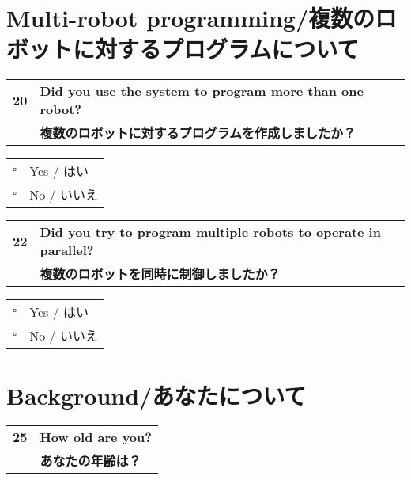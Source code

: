\begin{Form}
\section*{Multi-robot programming/複数のロボットに対するプログラムについて}
\vspace{.05in}
\begin{tabular}{rl}
\textbf{20} & \textbf{Did you use the system to program more than one robot?}\\
{} & \textbf{複数のロボットに対するプログラムを作成しましたか？}\\
\end{tabular}

\begin{tabular}{rl}
\quad $\square$ & Yes / はい \\
\quad $\square$ & No /  いいえ \\
\end{tabular}
\vspace{.1in}


\vspace{.05in}
\begin{tabular}{rl}
\textbf{22} & \textbf{Did you try to program multiple robots to operate in parallel?}\\
{} & \textbf{複数のロボットを同時に制御しましたか？}\\
\end{tabular}

\begin{tabular}{rl}
\quad $\square$ & Yes / はい \\
\quad $\square$ & No /  いいえ \\
\end{tabular}
\vspace{.1in}



\section*{Background/あなたについて}
\vspace{.05in}
\begin{tabular}{rl}
\textbf{25} & \textbf{How old are you?}\\
{} & \textbf{あなたの年齢は？}\\
\end{tabular}


\end{Form}
